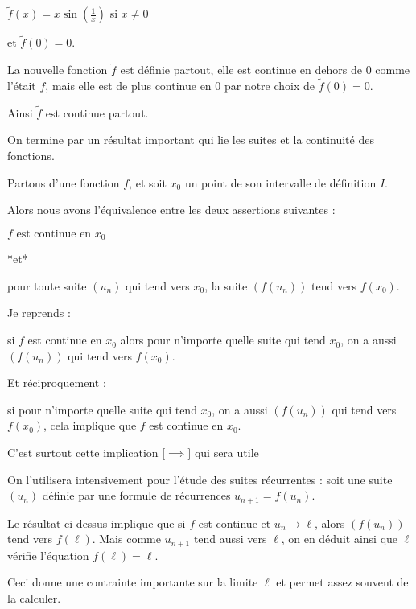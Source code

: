 $\tilde f(x) = x\sin\left(\frac1x\right)$ si $ x\neq 0$

et $\tilde f(0)=0$.

La nouvelle fonction $\tilde f$ est définie partout,
elle est continue en dehors de $0$ comme l'était $f$,
mais elle est de plus continue en $0$ par notre choix de $\tilde f(0)=0$.

Ainsi $\tilde f$ est continue partout.



\diapo

On termine par un résultat important qui lie les suites et la continuité des fonctions.

Partons d'une fonction $f$, et soit $x_0$ un point de son intervalle de définition $I$. 

\change


Alors nous avons l'équivalence entre les deux assertions suivantes  :

$f \text{ est continue en } x_0$


*et* 

pour toute suite $(u_n)$ qui tend vers $x_0$, la suite $(f(u_n))$ tend vers $f(x_0)$.


Je reprends :

si $f$ est continue en $x_0$ alors 
pour n'importe quelle suite qui tend $x_0$,
on a aussi $(f(u_n))$ qui tend vers $f(x_0)$.

Et réciproquement :

si pour  n'importe quelle suite qui tend $x_0$,
on a aussi $(f(u_n))$ qui tend vers $f(x_0)$,
cela implique que $f$ est continue en $x_0$.




C'est surtout cette implication [$\implies]$ qui sera utile

\change

On l'utilisera intensivement pour l'étude des suites récurrentes : soit une suite
$(u_n)$ définie par une formule de récurrences $u_{n+1}= f(u_n)$.

\change

Le résultat ci-dessus implique que 
si $f$ est continue et $u_n\to \ell$, 
alors $(f(u_n))$ tend vers $f(\ell)$. Mais comme $u_{n+1}$ tend aussi vers $\ell$, on en déduit ainsi que $\ell$ vérifie l'équation $f(\ell)=\ell$.

Ceci donne une contrainte importante sur la limite $\ell$ et permet assez souvent de la calculer.



